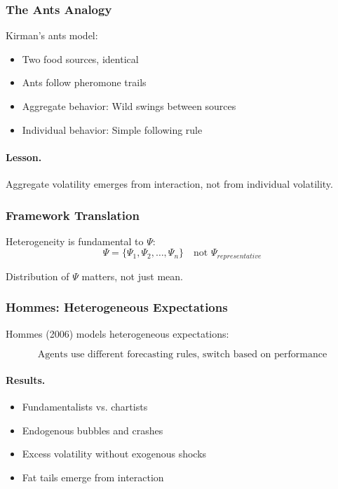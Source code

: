 \subsubsection{The Ants Analogy}

Kirman's ants model:
\begin{itemize}
    \item Two food sources, identical
    \item Ants follow pheromone trails
    \item Aggregate behavior: Wild swings between sources
    \item Individual behavior: Simple following rule
\end{itemize}

\paragraph{Lesson.}
Aggregate volatility emerges from interaction, not from individual volatility.

\subsubsection{Framework Translation}

Heterogeneity is fundamental to $\Psi$:
\begin{equation}
\Psi = \{\Psi_1, \Psi_2, \ldots, \Psi_n\} \quad \text{not } \Psi_{representative}
\end{equation}

Distribution of $\Psi$ matters, not just mean.

\subsubsection{Hommes: Heterogeneous Expectations}

Hommes (2006) models heterogeneous expectations:

\begin{equation}
\text{Agents use different forecasting rules, switch based on performance}
\end{equation}

\paragraph{Results.}
\begin{itemize}
    \item Fundamentalists vs. chartists
    \item Endogenous bubbles and crashes
    \item Excess volatility without exogenous shocks
    \item Fat tails emerge from interaction
\end{itemize}

